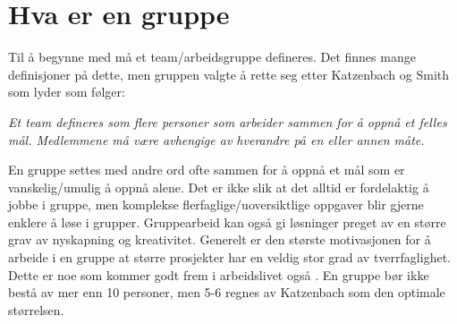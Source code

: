 \section{Hva er en gruppe}
Til å begynne med må et team/arbeidsgruppe defineres. 
Det finnes mange definisjoner på dette, men gruppen valgte å rette seg etter Katzenbach og Smith som lyder som følger: 

\begin{center}
\textit{Et team defineres som flere personer som arbeider sammen for å oppnå et felles mål. \newline
Medlemmene må være avhengige av hverandre på en eller annen måte.}
\newline 
\citep{katzenbach}
\end{center}

En gruppe settes med andre ord ofte sammen for å oppnå et mål som er vanskelig/umulig å oppnå alene. 
Det er ikke slik at det alltid er fordelaktig å jobbe i gruppe, men komplekse flerfaglige/uoversiktlige oppgaver blir gjerne enklere å løse i grupper.
Gruppearbeid kan også gi løsninger preget av en større grav av nyskapning og kreativitet. 
Generelt er den største motivasjonen for å arbeide i en gruppe at større prosjekter har en veldig stor grad av tverrfaglighet. 
Dette er noe som kommer godt frem i arbeidslivet også \citep{levin}. 
En gruppe bør ikke bestå av mer enn 10 personer, men 5-6 regnes av Katzenbach som den optimale størrelsen.
